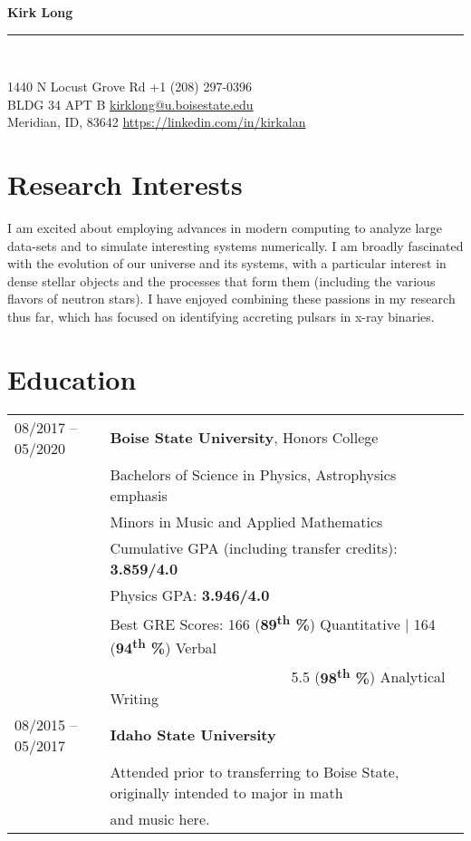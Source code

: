 \documentclass[11pt]{article}
\newcommand{\makeheading}[2]%
        {\begin{minipage}[t]{\textwidth}%
                 {\LARGE \bfseries #1} \\[-0.3\baselineskip]%
                 \rule{\columnwidth}{1.5pt}\\[0.1\baselineskip]
         \end{minipage}}
\begin{document}
\makeheading{Kirk Long}{}

1440 N Locust Grove Rd				\hfill	+1 (208) 297-0396\\
BLDG 34 APT B	\hfill	\href{mailto:kirklong@u.boisestate.edu}{kirklong@u.boisestate.edu}\\
Meridian, ID, 83642			\hfill	\url{https://linkedin.com/in/kirkalan}



\section{Research Interests}
 I am excited about employing advances in modern computing to analyze large data-sets and to simulate interesting systems numerically. I am broadly fascinated with the evolution of our universe and its systems, with a particular interest in dense stellar objects and the processes that form them (including the various flavors of neutron stars). I have enjoyed combining these passions in my research thus far, which has focused on identifying accreting pulsars in x-ray binaries.

\section{Education}
\begin{tabular}{ll}
08/2017 -- 05/2020	& 	\textbf{Boise State University}, Honors College \\
			&	Bachelors of Science in Physics, Astrophysics emphasis\\
			&	Minors in Music and Applied Mathematics\vspace{1mm} \\
			&	Cumulative GPA (including transfer credits): \textbf{3.859/4.0}\\
      & Physics GPA: \textbf{3.946/4.0} \\
      & Best GRE Scores: 166 (\textbf{89\textsuperscript{th} \%}) Quantitative | 164 (\textbf{94\textsuperscript{th} \%}) Verbal \\
      & \-\ \-\ \-\ \-\ \-\ \-\ \-\ \-\ \-\ \-\ \-\ \-\ \-\ \-\ \-\ \-\ \-\ \-\ \-\ \-\ \-\ \-\ \-\ \-\ \-\ 5.5 (\textbf{98\textsuperscript{th} \%}) Analytical Writing \vspace{2mm} \\
08/2015 -- 05/2017 & \textbf{Idaho State University} \\
      & Attended prior to transferring to Boise State, originally intended to major in math\\
      & and music here.\\

\end{tabular}
\end{document}
